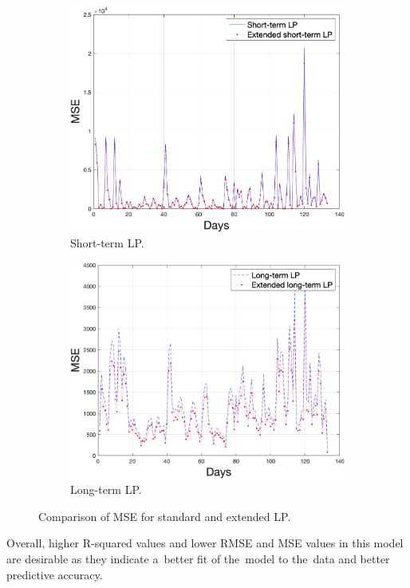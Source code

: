     \begin{figure}[!ht]
        \centering
        \begin{subfigure}[b]{0.6\textwidth}
            \includegraphics[width=1\textwidth]{figures/mseLP.png}
            \caption{Short-term LP.}
            \label{fig:mselp}
        \end{subfigure}
        \begin{subfigure}[b]{0.6\textwidth}
            \includegraphics[width=1\textwidth]{figures/mseLLP.png}
            \caption{Long-term LP.}
            \label{fig:ltlpmse}
        \end{subfigure}
        \caption{Comparison of MSE for standard and extended LP.}
        \label{fig:mseresult}
    \end{figure}
    Overall, higher R-squared values and lower RMSE and MSE values in this model are
    desirable as they indicate a~better fit of the~model to the~data and better predictive accuracy.
    
